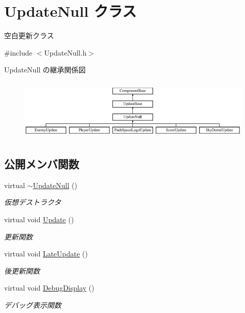 \hypertarget{class_update_null}{}\section{Update\+Null クラス}
\label{class_update_null}


空白更新クラス  




{\ttfamily \#include $<$Update\+Null.\+h$>$}

Update\+Null の継承関係図\begin{figure}[H]
\begin{center}
\leavevmode
\includegraphics[height=2.966887cm]{class_update_null}
\end{center}
\end{figure}
\subsection*{公開メンバ関数}
\begin{DoxyCompactItemize}
\item 
virtual \mbox{\hyperlink{class_update_null_a121a3045119935eb2704ef282bba2f9f}{$\sim$\+Update\+Null}} ()
\begin{DoxyCompactList}\small\item\em 仮想デストラクタ \end{DoxyCompactList}\item 
virtual void \mbox{\hyperlink{class_update_null_a692f4f34e4ef35ca286a1d3606fdf473}{Update}} ()
\begin{DoxyCompactList}\small\item\em 更新関数 \end{DoxyCompactList}\item 
virtual void \mbox{\hyperlink{class_update_null_ac68da1ba7f3fbcae833442bb1c169200}{Late\+Update}} ()
\begin{DoxyCompactList}\small\item\em 後更新関数 \end{DoxyCompactList}\item 
virtual void \mbox{\hyperlink{class_update_null_a77aee1e614cf6dafe4f9af58b2205e4b}{Debug\+Display}} ()
\begin{DoxyCompactList}\small\item\em デバッグ表示関数 \end{DoxyCompactList}\end{DoxyCompactItemize}


